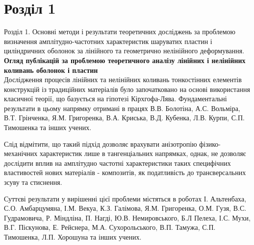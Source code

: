 \documentclass[8pt]{beamer}
\numberwithin{figure}{section}
\numberwithin{equation}{section}
\numberwithin{table}{section}
\begin{document}
\section{Розділ 1}

\begin{frame}{Розділ 1. Основні методи і результати теоретичних досліджень за проблемою визначення  амплітудно-частотних характеристик шаруватих пластин і циліндричних оболонок за лінійного та геометрично нелінійного деформування.}
\textbf{Огляд публікацій за проблемою теоретичного аналізу лінійних і нелінійних коливань оболонок і пластин}\\[3mm]
\indent Дослідження процесів лінійних та нелінійних коливань тонкостінних елементів конструкцій із традиційних матеріалів було започатковано на основі використання класичної теорії, що базується на гіпотезі Кірхгофа-Лява. Фундаментальні результати в цьому напрямку отримані в працях \alert{ В.В. Болотіна, А.С. Вольміра, В.Т. Грінченка, Я.М. Григоренка, В.А. Криська, В.Д. Кубенка, Л.В. Курпи, С.П. Тимошенка та інших учених}. 

\medskip 
Слід відмітити, що такий підхід дозволяє врахувати анізотропію фізико-механічних характеристик лише в тангенціальних напрямках, однак, не дозволяє дослідити вплив на амплітудно частотні характеристики  таких специфічних властивостей нових матеріалів - композитів, як податливість до трансверсальних зсуву та стиснення.

\medskip Суттєві результати у вирішенні цієї проблеми містяться в роботах І. Альтенбаха, С.О. Амбарцумяна, І.М. Векуа, К.З. Галімова, Я.М. Григоренка, О.М. Гузя, В.С. Гудрамовича, Р. Міндліна, П. Нагді, Ю.В. Немировського, Б.Л Пелеха, \alert{І.С. Мухи}, В.Г. Піскунова, Е. Рейснера, М.А. Сухорольського, В.П. Тамужа, С.П. Тимошенка, Л.П. Хорошуна та інших учених.
\end{frame}
\end{document}
